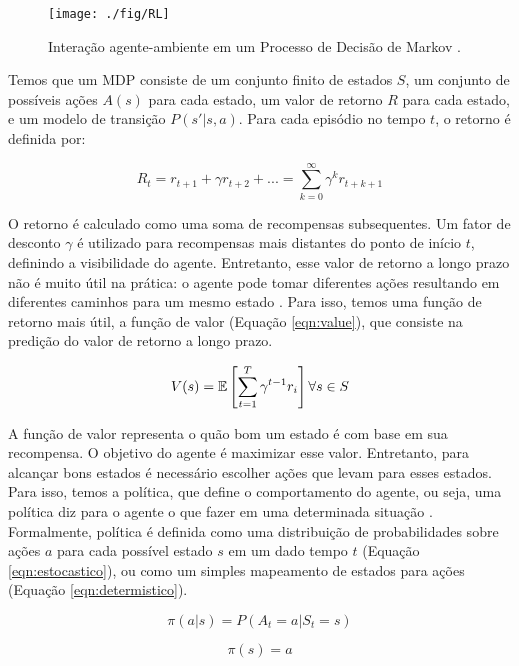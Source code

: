 \begin{figure}[ht]
 \centering
  \texttt{[image: ./fig/RL]}
 \caption{Interação agente-ambiente em um Processo de Decisão de Markov \cite{sutton-barto98}.}
 \label{fig:rl}
\end{figure}

Temos que um MDP consiste de um conjunto finito de estados $S$, um conjunto de possíveis ações $A(s)$ para cada estado, um valor de retorno $R$ para cada estado, e um modelo de transição $P(s'|s,a)$. Para cada episódio no tempo $t$, o retorno é definida por:

\begin{equation}
R_t = r_{t+1} + \gamma r_{t+2} + ... =  \sum^{\infty}_{k=0}\gamma^k r_{t+k+1}
\end{equation}

O retorno é calculado como uma soma de recompensas subsequentes. Um fator de desconto $\gamma$ é utilizado para recompensas mais distantes do ponto de início $t$, definindo a visibilidade do agente. Entretanto, esse valor de retorno a longo prazo não é muito útil na prática: o agente pode tomar diferentes ações resultando em diferentes caminhos para um mesmo estado \cite{Lapan2018}. Para isso, temos uma função de retorno mais útil, a função de valor (Equação \ref{eqn:value}), que consiste na predição do valor de retorno a longo prazo.

\begin{equation}
\label{eqn:value}
V(s) = \operatorname{\mathbb{E}} \left[\sum^{T}_{t=1}\gamma^{t-1}r_{i}\right] \forall s \in S
\end{equation}

A função de valor representa o quão bom um estado é com base em sua recompensa. O objetivo do agente é maximizar esse valor. Entretanto, para alcançar bons estados é necessário escolher ações que levam para esses estados. Para isso, temos a política, que define o comportamento do agente, ou seja, uma política diz para o agente o que fazer em uma determinada situação \cite{Lapan2018}. Formalmente, política é definida como uma distribuição de probabilidades sobre ações $a$ para cada possível estado $s$ em um dado tempo $t$ (Equação \ref{eqn:estocastico}), ou como um simples mapeamento de estados para ações (Equação \ref{eqn:determistico}).

\begin{equation}
\label{eqn:estocastico}
\pi(a|s) = P(A_t = a|S_t = s)
\end{equation}

\begin{equation}
\label{eqn:determistico}
\pi(s) = a
\end{equation}

